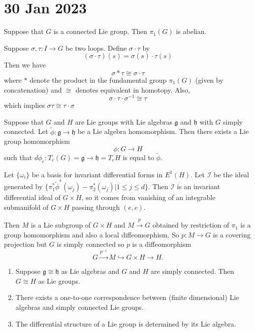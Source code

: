 \documentclass[11pt,a4paper]{scrarticle}
\theoremstyle{definition}
\renewenvironment{proof}[1][\proofname]{\vspace{-10pt}\begin{myproof}}{\end{myproof}}
\theoremstyle{greenbox}
\begin{document}
\section{30 Jan 2023}
\vspace{0.5cm}
\begin{lemma}
    Suppose that $ G $ is a connected Lie group. Then $ \pi_{1}(G) $ is abelian.
\end{lemma}
\begin{proof}
    Suppose $ \sigma, \tau : I \to G $ be two loops. Define $ \sigma \cdot \tau $ by 
    \[ (\sigma \cdot \tau)(s) = \sigma (s) \cdot \tau (s) \]
    Then we have 
    \[ \sigma * \tau \cong \sigma \cdot \tau \]
    where $ * $ denote the product in the fundamental group $ \pi_{1}(G) $ (given by concatenation) and $ \cong $ denotes equivalent in homotopy. Also, 
    \[ \sigma \cdot \tau \cdot \sigma^{-1} \cong \tau\]
    which implies $  \sigma \tau \cong \tau \cdot \sigma $
\end{proof}
\begin{thm}
    Suppose that $ G $ and $ H $ are Lie groups with Lie algebras $ \mathfrak{g} $ and $ \mathfrak{h} $ with $ G $ simply connected. Let $ \tilde{\phi} : \mathfrak{g} \to \mathfrak{h} $ be a Lie algebra homomorphism. Then there exists a Lie group homomorphism 
    \[ \phi : G \to H \]
    such that $ d \phi_{e} : T_{e}(G) = \mathfrak{g}\to \mathfrak{h} = T_{e}H $ is equal to $ \tilde{\phi} $.
\end{thm}
\begin{proof}
    [Idea] Let $ \{\omega_{i}\} $ be a basis for invariant differential forms in $ E^{1}(H) $. Let $ \mathscr{I} $ be the ideal generated by $ \{\pi_{1}^{*}\tilde{\phi}^{*}(\omega_{j}) - \pi_{2}^{*}(\omega_{j})| 1\le j \le d\} $. Then $ \mathscr{I} $ is an invariant differential ideal of $ G \times H $, so it comes from vanishing of an integrable submanifold of $ G \times H $ passing through $ (e,e) $. 

    Then $ M $ is a Lie subgroup of $ G \times H $ and $ M \xrightarrow{p} G $ obtained by restriction of $ \pi_{1} $ is a group homomorphism and also a local diffeomorphism. So $ p: M \to G $ is a covering projection but $ G $ is simply connected so $ p $ is a diffeomorphism 
    \[ G \xrightarrow{p^{-1}} M \hookrightarrow G \times H \to H. \]
\end{proof}

\begin{corollary}
    \begin{enumerate}
        \item Suppose $ \mathfrak{ g} \cong \mathfrak{h} $ as Lie algebras and $ G $ and $ H $ are simply connected. Then $ G \cong H $ as Lie groups.
        \item There exists a one-to-one correspondence between (finite dimensional) Lie algebras and simply connected Lie groups.
        \item The differential structure of a Lie group is determined by its Lie algebra.
    \end{enumerate}
\end{corollary}
\end{document}
